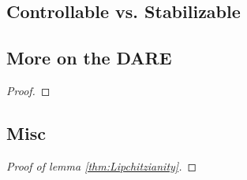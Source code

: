 \documentclass[12pt]{article}
\begin{document}
\newpage

\subsection*{Controllable vs. Stabilizable}\label{sec:controllability-stabilizability}

\subsection*{More on the DARE}\label{sec:DARE}

\begin{lemma}

\end{lemma}

\begin{proof}

\end{proof}

\subsection*{Misc}

\begin{proof}[Proof of lemma \ref{thm:Lipchitzianity}]

\end{proof}
\end{document}
